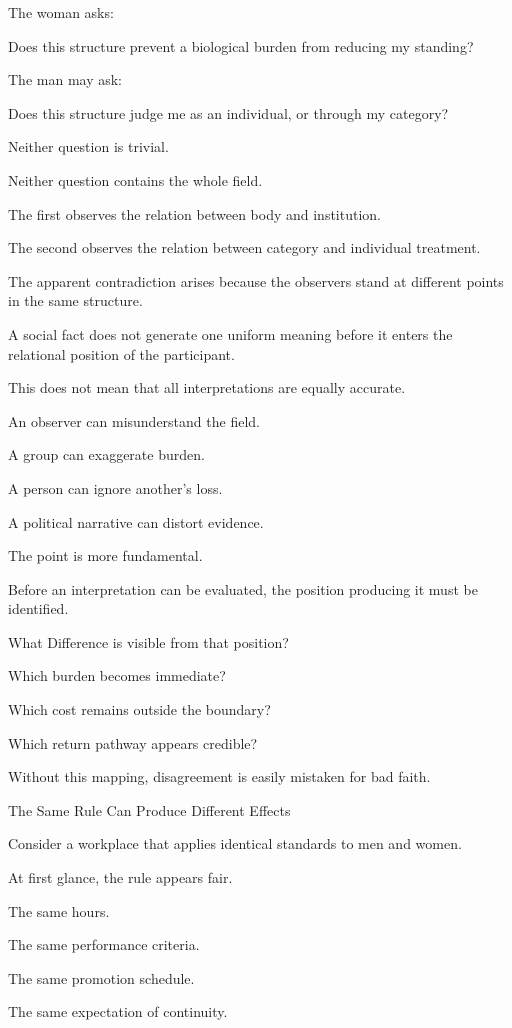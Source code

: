 The woman asks:

Does this structure prevent a biological burden from reducing my standing?

The man may ask:

Does this structure judge me as an individual, or through my category?

Neither question is trivial.

Neither question contains the whole field.

The first observes the relation between body and institution.

The second observes the relation between category and individual treatment.

The apparent contradiction arises because the observers stand at different points in the same structure.

A social fact does not generate one uniform meaning before it enters the relational position of the participant.

This does not mean that all interpretations are equally accurate.

An observer can misunderstand the field.

A group can exaggerate burden.

A person can ignore another’s loss.

A political narrative can distort evidence.

The point is more fundamental.

Before an interpretation can be evaluated, the position producing it must be identified.

What Difference is visible from that position?

Which burden becomes immediate?

Which cost remains outside the boundary?

Which return pathway appears credible?

Without this mapping, disagreement is easily mistaken for bad faith.

The Same Rule Can Produce Different Effects

Consider a workplace that applies identical standards to men and women.

At first glance, the rule appears fair.

The same hours.

The same performance criteria.

The same promotion schedule.

The same expectation of continuity.

